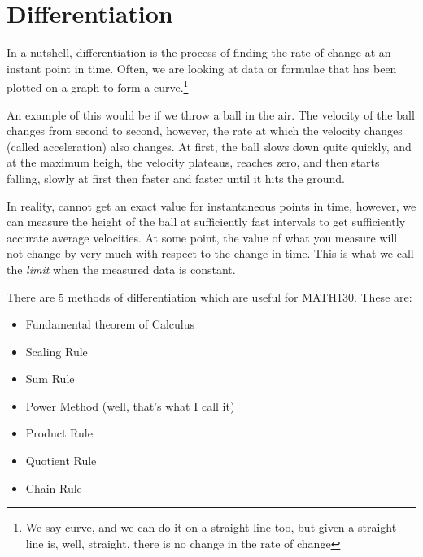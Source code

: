 \chapter{Differentiation}
\label{chap:Differentiation}
In a nutshell, differentiation is the process of finding the rate of change at
an instant point in time. Often, we are looking at data or formulae that has
been plotted on a graph to form a curve.\footnote{We say curve, and we can do it
on a straight line too, but given a straight line is, well, straight, there is
no change in the rate of change}

An example of this would be if we throw a ball in the air. The velocity of the
ball changes from second to second, however, the rate at which the velocity
changes (called acceleration) also changes. At first, the ball slows down quite
quickly, and at the maximum heigh, the velocity plateaus, reaches zero, and then
starts falling, slowly at first then faster and faster until it hits the ground.

In reality, cannot get an exact value for instantaneous points in time, however,
we can measure the height of the ball at sufficiently fast intervals to
get sufficiently accurate average velocities. At some point, the value of what
you measure will not change by very much with respect to the change in time.
This is what we call the \emph{limit} when the measured data is constant.

There are 5 methods of differentiation which are useful for MATH130. These are:
\begin{itemize}
  \item Fundamental theorem of Calculus
  \item Scaling Rule
  \item Sum Rule
  \item Power Method (well, that's what I call it)
  \item Product Rule
  \item Quotient Rule
  \item Chain Rule
\end{itemize}

